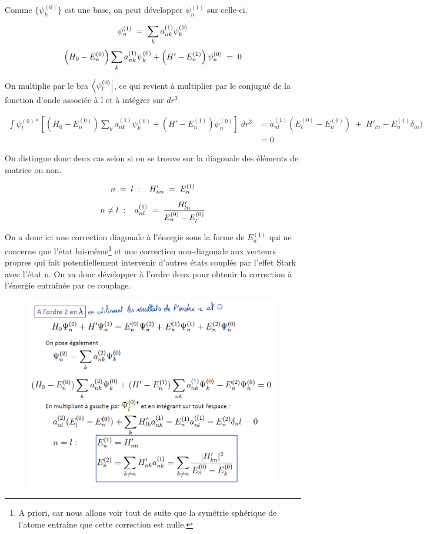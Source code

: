 Comme $\{\psi_k^{(0)}\}$ est une base, on peut développer $\psi_n^{(1)}$ sur celle-ci.

\[
    \psi_n^{(1)} \; = \; \sum_k a_{nk}^{(1)} \psi_k^{(0)}
\]
\[
    \left(H_0 - E^{(0)}_n\right)\sum_k a_{nk}^{(1)} \psi_k^{(0)} + \left(H' - E^{(1)}_n\right)\psi_n^{(0)} \; = \; 0
\]

On multiplie par le bra $\bra{\psi^{(0)}_l}$, ce qui revient à multiplier par le conjugué de la fonction d'onde associée à l et à intégrer sur $dr^3$.

\begin{align*}
    \int \psi^{(0)*}_l\left[ \left(H_0 - E^{(0)}_n\right)\sum_k a_{nk}^{(1)} \psi_k^{(0)} + \left(H' - E^{(1)}_n\right)\psi_n^{(0)}\right] \;dr^3 &= a^{(1)}_{nl}(E^{(0)}_l-E^{(0)}_n) \;+\; H'_{ln} - E^{(1)}_n\delta_{ln})\\
    &= 0
\end{align*}

On distingue donc deux cas selon si on se trouve sur la diagonale des éléments de matrice ou non.

\[
    n \; = \;  l\;:\;\;\; H'_{nn} \; = \; E^{(1)}_n
\]
\[
    n \neq l\;:\;\;\; a^{(1)}_{nl} \; = \; \dfrac{H'_{ln}}{E^{(0)}_n-E^{(0)}_l}
\]

On a donc ici une correction diagonale à l'énergie sous la forme de $E^{(1)}_n$ qui ne concerne que l'état lui-même\footnote{A priori, car nous allons voir tout de suite que la symétrie sphérique de l'atome entraîne que cette correction est nulle.} et une correction non-diagonale aux vecteurs propres qui fait potentiellement intervenir d'autres états couplés par l'effet Stark avec l'état n. On va donc développer à l'ordre deux pour obtenir la correction à l'énergie entraînée par ce couplage.\\

\begin{figure}[tph]
    \centering
    \includegraphics[scale=0.65]{Images2/ordre2.1.PNG}
\end{figure}


